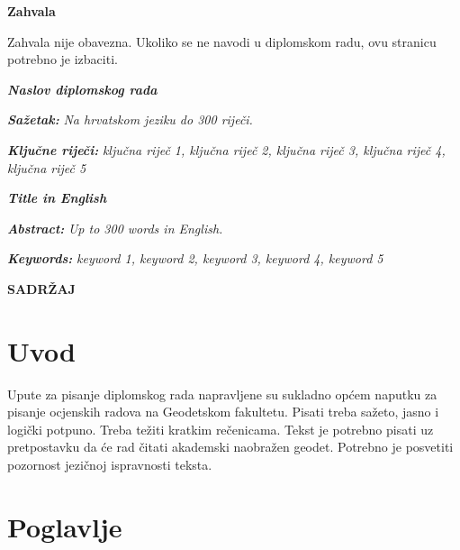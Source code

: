 \documentclass[12pt, oneside, a4paper, hidelinks]{report}
\newcommand{\mytitle}{Naslov diplomskog rada}
\newcommand{\myauthor}{Ime i prezime}
\newcommand{\myabstract}{Na hrvatskom jeziku do 300 riječi.}
\newcommand{\mykeywords}{ključna riječ 1, ključna riječ 2, ključna riječ 3, ključna riječ 4, ključna riječ 5}
\begin{document}
	\newpage
	\vspace*{4.5in}
	\noindent
	\large\textbf{Zahvala}
	\begin{spacing}{1.5}
		\noindent\normalsize
		Zahvala nije obavezna. Ukoliko se ne navodi u diplomskom radu, ovu stranicu potrebno je izbaciti.
	\end{spacing}
	
	\newpage
	\begin{center}
		\textbf{\textit{\mytitle}}
	\end{center}
	\textbf{\textit{Sažetak: }}\textit{\myabstract}
	
	\textbf{\textit{Ključne riječi: }}\textit{\mykeywords}
	
	\vfill
	
	\begin{center}
		\textbf{\textit{Title in English}}
	\end{center}
	\textbf{\textit{Abstract: }}\textit{Up to 300 words in English.}
	
	\textbf{\textit{Keywords: }}\textit{keyword 1, keyword 2, keyword 3, keyword 4, keyword 5}
	
	\newpage
	\setlength{\cftbeforetoctitleskip}{0pt}
	\setlength{\cftaftertoctitleskip}{0pt}
	\renewcommand{\contentsname}{}
	\begin{center}
		\textbf{\large\MakeUppercase{Sadržaj}}
	\end{center} 
	\tableofcontents
	
	\chapter{Uvod}
	\normalsize
	\thispagestyle{fancy}
	
	\pagestyle{fancy}
	\fancyhf{}
	\fancyhead[L]{\small \myauthor}
	
	\renewcommand{\headrulewidth}{0.4pt}
	\renewcommand{\footrulewidth}{0.4pt}
	\setlength{\headheight}{13.6pt}
	\fancyfoot[R]{\small \thepage}
	
	Upute za pisanje diplomskog rada napravljene su sukladno općem naputku za pisanje ocjenskih radova na Geodetskom fakultetu. Pisati treba sažeto, jasno i logički potpuno. Treba težiti kratkim rečenicama. Tekst je potrebno pisati uz pretpostavku da će rad čitati akademski naobražen geodet. Potrebno je posvetiti pozornost jezičnoj ispravnosti teksta.	
	
	\chapter{Poglavlje}
	\thispagestyle{fancy}
	
\end{document}

